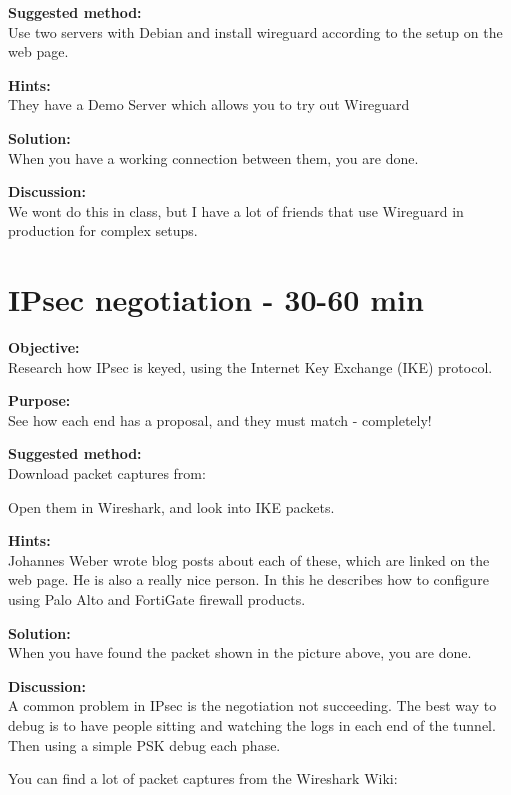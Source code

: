 \documentclass[a4paper,11pt,notitlepage]{report}
\begin{document}
{\bf Suggested method:}\\
Use two servers with Debian and install wireguard according to the setup on the web page.



{\bf Hints:}\\
They have a Demo Server which allows you to try out Wireguard

{\bf Solution:}\\
When you have a working connection between them, you are done.

{\bf Discussion:}\\
We wont do this in class, but I have a lot of friends that use Wireguard in production for complex setups.



\chapter{IPsec negotiation - 30-60 min}
\label{ex:-ipsec-wireshark}


{\bf Objective:}\\
Research how IPsec is keyed, using the Internet Key Exchange (IKE) protocol.

{\bf Purpose:}\\
See how each end has a proposal, and they must match - completely!

{\bf Suggested method:}\\
Download packet captures from:

Open them in Wireshark, and look into IKE packets.

{\bf Hints:}\\
Johannes Weber wrote blog posts about each of these, which are linked on the web page. He is also a really nice person.
In this he describes how to configure using Palo Alto and FortiGate firewall products.

{\bf Solution:}\\
When you have found the packet shown in the picture above, you are done.

{\bf Discussion:}\\
A common problem in IPsec is the negotiation not succeeding.
The best way to debug is to have people sitting and watching the logs in each end of the tunnel. Then using a simple PSK debug each phase.

You can find a lot of packet captures from the Wireshark Wiki:\\
\end{document}
